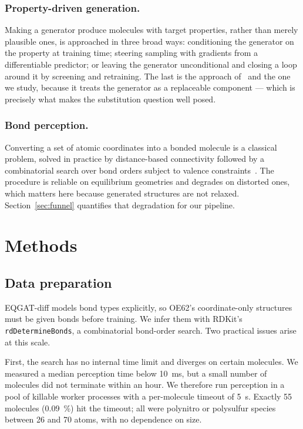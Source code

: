 \documentclass[runningheads]{llncs}
\begin{document}
\subsubsection{Property-driven generation.}
Making a generator produce molecules with target properties, rather
than merely plausible ones, is approached in three broad ways:
conditioning the generator on the property at training
time; steering sampling with gradients from a differentiable predictor;
or leaving the generator unconditional and closing a loop around it by
screening and retraining. The last is the approach
of~\cite{westermayr2022} and the one we study, because it treats the
generator as a replaceable component --- which is precisely what makes
the substitution question well posed.

\subsubsection{Bond perception.}
Converting a set of atomic coordinates into a bonded molecule is a
classical problem, solved in practice by distance-based connectivity
followed by a combinatorial search over bond orders subject to valence
constraints~\cite{kim2015}. The procedure is reliable on equilibrium
geometries and degrades on distorted ones, which matters here because
generated structures are not relaxed. Section~\ref{sec:funnel}
quantifies that degradation for our pipeline.

\section{Methods}

\subsection{Data preparation}
\label{sec:data}

EQGAT-diff models bond types explicitly, so OE62's coordinate-only
structures must be given bonds before training. We infer them with
RDKit's \texttt{rdDetermineBonds}, a combinatorial bond-order search.
Two practical issues arise at this scale.

First, the search has no internal time limit and diverges on certain
molecules. We measured a median perception time below
\SI{10}{\milli\second}, but a small number of molecules did not
terminate within an hour. We therefore run perception in a pool of
killable worker processes with a per-molecule timeout of
\SI{5}{\second}. Exactly \num{55} molecules (\SI{0.09}{\percent}) hit
the timeout; all were polynitro or polysulfur species between 26 and 70
atoms, with no dependence on size.
\end{document}
